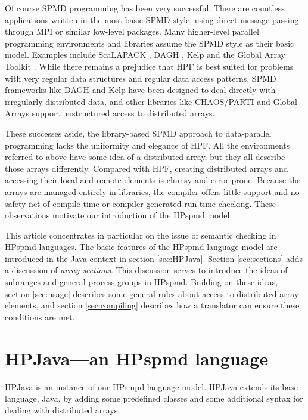 \documentclass{article}
\begin{document}
Of course SPMD programming has been very successful.  There are
countless applications written in the most basic SPMD style, using
direct message-passing through MPI \cite{MPIStandard} or similar
low-level packages.  Many higher-level parallel programming
environments and libraries assume the SPMD style as their basic model.
Examples include ScaLAPACK \cite{ScaLAPACK}, 
DAGH \cite{HDDA_DAGH},
Kelp \cite{Block_structured} and the Global Array
Toolkit \cite{Global_Arrays}.  While there remains a prejudice that HPF
is best suited for problems with very regular data structures and
regular data access patterns, SPMD frameworks like DAGH and Kelp have
been designed to deal directly with irregularly distributed data, and
other libraries like CHAOS/PARTI \cite{CHAOS} and Global Arrays support
unstructured access to distributed arrays.

These successes aside, the library-based SPMD
approach to data-parallel programming lacks the uniformity
and elegance of HPF.  All the environments referred to above have some
idea of a distributed array, but they all describe those arrays
differently.  Compared with HPF, creating distributed arrays and
accessing their local and remote elements is clumsy and error-prone.
Because the arrays are managed entirely in libraries, the compiler
offers little support and no safety net of compile-time or
compiler-generated run-time checking.  These observations
motivate our introduction of the HPspmd model.

This article concentrates in particular on the issue of semantic
checking in HPspmd languages.  The basic features of the HPspmd
language model are introduced in the Java context in section
\ref{sec:HPJava}.  Section \ref{sec:sections} adds a discussion
of {\em array sections}.  This discussion serves to introduce
the ideas of subranges and general process groups in HPspmd.  
Building on these ideas, section \ref{sec:usage} describes
some general rules about access to distributed array elements, and
section \ref{sec:compiling} describes how a translator can
ensure these conditions are met. 

\section{HPJava---an HPspmd language\label{sec:HPJava}}

HPJava \cite{HPJava} is an instance of our HPsmpd language
model.  HPJava extends its base language, Java, by adding some
predefined classes and some additional syntax for dealing with
distributed arrays.
\end{document}
